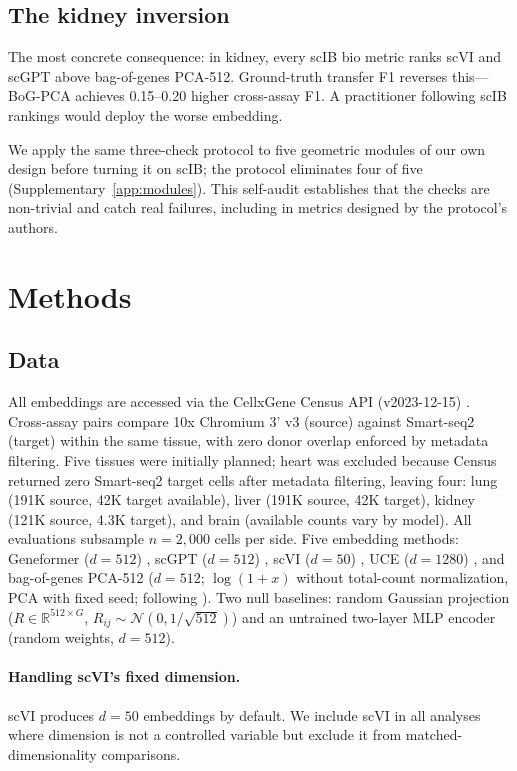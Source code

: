 \documentclass[11pt]{article}
\begin{document}
\subsection{The kidney inversion}
\label{sec:kidney}

The most concrete consequence: in kidney, every scIB bio metric ranks scVI and scGPT above bag-of-genes PCA-512. Ground-truth transfer F1 reverses this---BoG-PCA achieves 0.15--0.20 higher cross-assay F1. A practitioner following scIB rankings would deploy the worse embedding.

We apply the same three-check protocol to five geometric modules of our own design before turning it on scIB; the protocol eliminates four of five (Supplementary~\ref{app:modules}). This self-audit establishes that the checks are non-trivial and catch real failures, including in metrics designed by the protocol's authors.


\section{Methods}

\subsection{Data}

All embeddings are accessed via the CellxGene Census API (v2023-12-15) \citep{abdulla2025cellxgene}. Cross-assay pairs compare 10x Chromium 3' v3 (source) against Smart-seq2 (target) within the same tissue, with zero donor overlap enforced by metadata filtering. Five tissues were initially planned; heart was excluded because Census returned zero Smart-seq2 target cells after metadata filtering, leaving four: lung (191K source, 42K target available), liver (191K source, 42K target), kidney (121K source, 4.3K target), and brain (available counts vary by model). All evaluations subsample $n = 2{,}000$ cells per side. Five embedding methods: Geneformer ($d = 512$) \citep{theodoris2023geneformer}, scGPT ($d = 512$) \citep{cui2024scgpt}, scVI ($d = 50$) \citep{lopez2018scvi}, UCE ($d = 1280$) \citep{rosen2026uce}, and bag-of-genes PCA-512 ($d = 512$; $\log(1 + x)$ without total-count normalization, PCA with fixed seed; following \citealp{cole2026morpheus}). Two null baselines: random Gaussian projection ($R \in \mathbb{R}^{512 \times G}$, $R_{ij} \sim \mathcal{N}(0, 1/\sqrt{512})$) and an untrained two-layer MLP encoder (random weights, $d = 512$).

\paragraph{Handling scVI's fixed dimension.} scVI produces $d = 50$ embeddings by default. We include scVI in all analyses where dimension is not a controlled variable but exclude it from matched-dimensionality comparisons.
\end{document}
